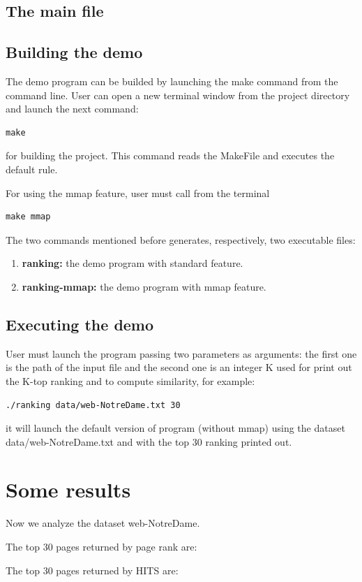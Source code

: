 \documentclass[10pt]{article}
\begin{document}
\subsection{The main file}

\subsection{Building the demo}
The demo program can be builded by launching the make command from the command line.
User can open a new terminal window from the project directory and launch the next command:
\begin{verbatim}make\end{verbatim}
for building the project. This command reads the MakeFile and executes the default rule.

For using the mmap feature, user must call from the terminal
\begin{verbatim}make mmap\end{verbatim}
The two commands mentioned before generates, respectively, two executable files:
\begin{enumerate}
    \item {\bf ranking:} the demo program with standard feature.
    \item {\bf ranking-mmap:} the demo program with mmap feature.
\end{enumerate}

\subsection{Executing the demo}
User must launch the program passing two parameters as arguments: the first one is the path of the input file and the second one is an integer K used for print out the K-top ranking and to compute similarity, for example:
\begin{verbatim}./ranking data/web-NotreDame.txt 30\end{verbatim}
it will launch the default version of program (without mmap) using the dataset data/web-NotreDame.txt and with the top 30 ranking printed out.
\section{Some results}
Now we analyze the dataset web-NotreDame. 

The top 30 pages returned by page rank are:

The top 30 pages returned by HITS are:
\end{document}
